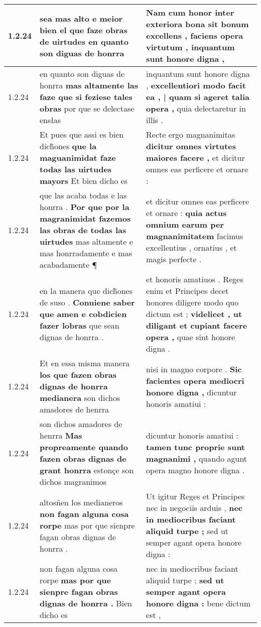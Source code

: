\begin{tabular}{|p{1cm}|p{6.5cm}|p{6.5cm}|}
1.2.24 & sea mas alto e meior bien \textbf{ el que faze obras de uirtudes } en quanto son diguas de honrra & Nam cum honor inter exteriora bona sit bonum excellens , \textbf{ faciens opera virtutum , } inquantum sunt honore digna , \\\hline
1.2.24 & en quanto son diguas de honrra \textbf{ mas altamente las faze que si feziese tales obras } por que se delectase ensłas & inquantum sunt honore digna , \textbf{ excellentiori modo facit ea , | quam si ageret talia opera , } quia delectaretur in illis . \\\hline
1.2.24 & Et pues que assi es bien dich̃ones \textbf{ que la maguanimidat faze todas las uirtudes mayors } Et bien dicho es & Recte ergo magnanimitas \textbf{ dicitur omnes virtutes maiores facere , } et dicitur omnes eas perficere et ornare : \\\hline
1.2.24 & que las acaba todas e las honrra . \textbf{ Por que por la magranimidat fazemos las obras de todas las uirtudes } mas altamente e mas honrradamente e mas acabadamente ¶ & et dicitur omnes eas perficere et ornare : \textbf{ quia actus omnium earum per magnanimitatem } facimus excellentius , ornatius , et magis perfecte . \\\hline
1.2.24 & en la manera que dich̃ones de suso . \textbf{ Conuiene saber que amen e cobdicien fazer lobras } que sean dignas de honrra . & et honoris amatiuos . Reges enim et Principes decet honores diligere modo quo dictum est ; \textbf{ videlicet , ut diligant et cupiant facere opera , } quae sint honore digna . \\\hline
1.2.24 & Et en essa misma manera \textbf{ los que fazen obras dignas de honrra medianera } son dichos amadores de henrra & nisi in magno corpore . \textbf{ Sic facientes opera mediocri honore digna , } dicuntur honoris amatiui : \\\hline
1.2.24 & son dichos amadores de henrra \textbf{ Mas propreamente quando fazen obras dignas de grant honrra } estonçe son dichos magranimos & dicuntur honoris amatiui : \textbf{ tamen tunc proprie sunt magnanimi , } quando agunt opera magno honore digna . \\\hline
1.2.24 & altosñen los medianeros \textbf{ non fagan alguna cosa rorpe } mas por que sienpre fagan obras dignas de honrra . & Ut igitur Reges et Principes nec in negociis arduis , \textbf{ nec in mediocribus faciant aliquid turpe ; } sed ut semper agant opera honore digna : \\\hline
1.2.24 & non fagan alguna cosa rorpe \textbf{ mas por que sienpre fagan obras dignas de honrra . } Bien dicho es & nec in mediocribus faciant aliquid turpe ; \textbf{ sed ut semper agant opera honore digna : } bene dictum est , \\\hline

\end{tabular}
